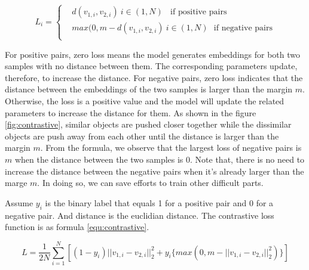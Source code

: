\begin{equation}
L_i = \left\{
\begin{aligned}
 & d(v_{1,i}, v_{2,i}) \ i \in (1, N) \ \ \ \ \text{if positive pairs} \\
 & max(0, m - d(v_{1,i}, v_{2,i}) \   i \in (1, N) \ \  \  \text{if negative pairs} \\
\end{aligned}
\right.
\label{equ:loss}
\end{equation}

For positive pairs, zero loss means the model generates embeddings for both two samples with no distance between them. The corresponding parameters update, therefore, to increase the distance. For negative pairs, zero loss indicates that the distance between the embeddings of the two samples is larger than the margin $m$. Otherwise, the loss is a positive value and the model will update the related parameters to increase the distance for them. As shown in the figure \ref{fig:contrastive}, similar objects are pushed closer together while the dissimilar objects are push away from each other until the distance is larger than the margin $m$. From the formula, we observe that the largest loss of negative pairs is $m$ when the distance between the two samples is 0. Note that, there is no need to increase the distance between the negative pairs when it's already larger than the marge $m$. In doing so, we can save efforts to train other difficult parts. 

Assume $y_i$ is the binary label that equals 1 for a positive pair and 0 for a negative pair. And distance is the euclidian distance. The contrastive loss function is as formula \ref{equ:contrastive}.

\begin{equation}
L = \frac{1}{2N}\sum_{i=1}^{N}[(1 - y_i) || v_{1,i} - v_{2,i} ||_2^2 +  y_i\{ max(0, m - ||v_{1,i} - v_{2,i}||_2^2) \}]
\label{equ:contrastive}
\end{equation}

